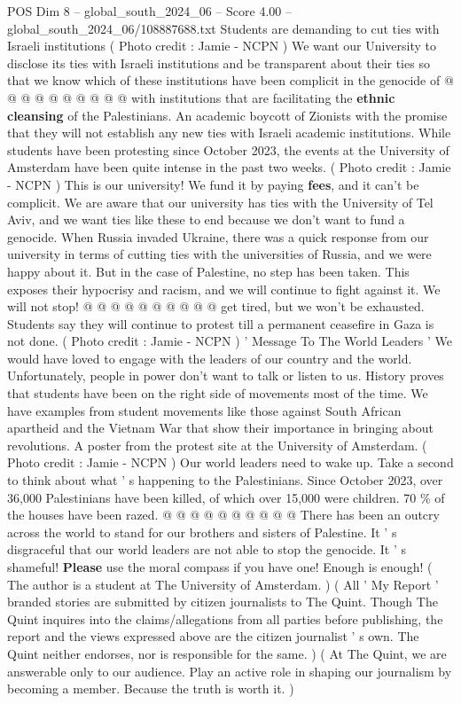 \begin{textsample}{POS Dim 8 – global\_south\_2024\_06 – Score 4.00 – global\_south\_2024\_06/108887688.txt}
Students are demanding to cut ties with Israeli institutions ( Photo credit : Jamie - NCPN ) We want our University to disclose its ties with Israeli institutions and be transparent about their ties so that we know which of these institutions have been complicit in the genocide of @ @ @ @ @ @ @ @ @ @ with institutions that are facilitating the \textbf{ethnic} \textbf{cleansing} of the Palestinians.
An academic boycott of Zionists with the promise that they will not establish any new ties with Israeli academic institutions.
While students have been protesting since October 2023, the events at the University of Amsterdam have been quite intense in the past two weeks. ( Photo credit : Jamie - NCPN ) This is our university!
We fund it by paying \textbf{fees}, and it can't be complicit.
We are aware that our university has ties with the University of Tel Aviv, and we want ties like these to end because we don't want to fund a genocide.
When Russia invaded Ukraine, there was a quick response from our university in terms of cutting ties with the universities of Russia, and we were happy about it.
But in the case of Palestine, no step has been taken.
This exposes their hypocrisy and racism, and we will continue to fight against it.
We will not stop! @ @ @ @ @ @ @ @ @ @ get tired, but we won't be exhausted.
Students say they will continue to protest till a permanent ceasefire in Gaza is not done. ( Photo credit : Jamie - NCPN ) ' Message To The World Leaders ' We would have loved to engage with the leaders of our country and the world.
Unfortunately, people in power don't want to talk or listen to us.
History proves that students have been on the right side of movements most of the time.
We have examples from student movements like those against South African apartheid and the Vietnam War that show their importance in bringing about revolutions.
A poster from the protest site at the University of Amsterdam. ( Photo credit : Jamie - NCPN ) Our world leaders need to wake up.
Take a second to think about what ' s happening to the Palestinians.
Since October 2023, over 36,000 Palestinians have been killed, of which over 15,000 were children. 70 \% of the houses have been razed. @ @ @ @ @ @ @ @ @ @ There has been an outcry across the world to stand for our brothers and sisters of Palestine.
It ' s disgraceful that our world leaders are not able to stop the genocide.
It ' s shameful! \textbf{Please} use the moral compass if you have one!
Enough is enough! ( The author is a student at The University of Amsterdam. ) ( All ' My Report ' branded stories are submitted by citizen journalists to The Quint.
Though The Quint inquires into the claims/allegations from all parties before publishing, the report and the views expressed above are the citizen journalist ' s own.
The Quint neither endorses, nor is responsible for the same. ) ( At The Quint, we are answerable only to our audience.
Play an active role in shaping our journalism by becoming a member.
Because the truth is worth it. )

\end{textsample}
